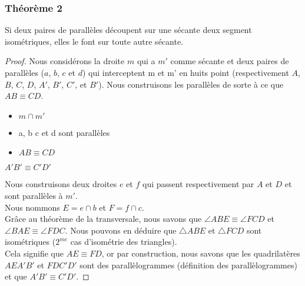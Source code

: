 \documentclass[a4paper,12pt]{article}
\begin{document}
\pagebreak
\subsubsection{Théorème 2}
\begin{theorem}\label{semblableTh2}
Si deux paires de parallèles découpent sur une sécante deux segment isométriques, elles le font sur toute autre sécante.
\end{theorem}

\begin{proof}
Nous considérons la droite $m$ qui a $m'$ comme sécante et deux paires de parallèles ($a$, $b$, $c$ et $d$) qui interceptent m et m' en huits point (respectivement $A$, $B$, $C$, $D$, $A'$, $B'$, $C'$, et $B'$). Nous construisons les parallèles de sorte à ce que $AB \equiv CD$.


\begin{hyp}
\begin{itemize}
    \item $m \cap m'$
    \item a, b c et d sont parallèles
    \item $AB \equiv CD$
\end{itemize}
\end{hyp}
\begin{concl}
$A'B' \equiv C'D'$
\end{concl}
Nous construisons deux droites $e$ et $f$ qui passent respectivement par $A$ et $D$ et sont parallèles à $m'$.\\
Nous nommons $E = e \cap b$ et $F = f \cap c$.\\
Grâce au théorème de la transversale, nous savons que $\angle ABE \equiv \angle FCD$ et $\angle BAE \equiv \angle FDC$. Nous pouvons en déduire que $\triangle ABE$ et $\triangle FCD$ sont isométriques ($2^{me}$ cas d'isométrie des triangles).\\

Cela signifie que $AE \equiv FD$, or par construction, nous savons que  les quadrilatères $AEA'B'$ et $FDC'D'$ sont des parallèlogrammes (définition des parallèlogrammes) et que $A'B' \equiv C'D'$.
\end{proof}
\end{document}
